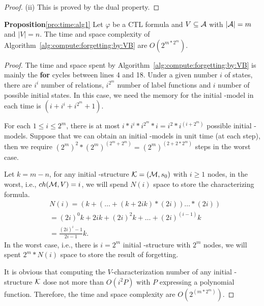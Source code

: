 \documentclass[letterpaper]{article} %
\begin{document}
\begin{proof}
(ii) This is proved by the dual property.
\end{proof}



\noindent\textbf{Proposition}\ref{pro:time:alg1} Let $\varphi$ be a CTL formula and $V\subseteq {\cal A}$  with $|{\cal A}|=m$ and $|V|=n$. The time and space complexity of
Algorithm~\ref{alg:compute:forgetting:by:VB} are $O(2^{m*2^m})$.\\
\begin{proof}
The time and space spent by Algorithm~\ref{alg:compute:forgetting:by:VB} is mainly the \textbf{for} cycles between lines 4 and 18.
Under a given number $i$ of states, there are $i^i$ number of relations, $i^{2^m}$ number of label functions and $i$ number of possible initial states. In this case, we need the memory for the initial \MPK-model in each time is $(i+i^i+i^{2^m}+1)$.

For each $1\leq i \leq 2^m$, there is at most $i*i^i*i^{2^m}*i=i^2*i^{(i+2^m)}$ possible initial \MPK-models.
Suppose that we can obtain an initial \MPK-models in unit time (at each step), then we require $(2^m)^2*(2^m)^{(2^m+2^m)} = (2^m)^{(2+2*2^m)}$ steps in the worst case.

Let $k=m-n$, for any initial \MPK-structure ${\cal K}=({\cal M}, s_0)$ with $i\geq 1$ nodes, in the worst, i.e., $ch({\cal M},V)=i$, we will spend $N(i)$ space to store the characterizing formula.
\begin{align*}
 & N(i)=(k+(\dots + (k + 2ik)*(2i))\dots *(2i))\\
 & = (2i)^0k + 2ik + (2i)^2k+ \dots + (2i)^{(i-1)}k\\
 & = \frac{(2i)^i -1}{2i-1} k.
\end{align*}
In the worst case, i.e., there is $i=2^m$ initial \MPK-structure with $2^m$ nodes, we will spent $2^m*N(i)$ space to store the result of forgetting.

It is obvious that computing the $V$-characterization number of any initial \MPK-structure $\cal K$ dose not more than $O(i^2P)$ with $P$ expressing a polynomial function.
Therefore, the time and space complexity are $O(2^{(m*2^m)})$.
\end{proof}



\end{document}
